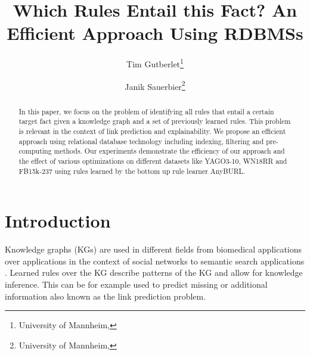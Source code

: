 \documentclass[english]{lni}
\begin{document}
\title[Which Rules Entail this Fact? An Efficient Approach Using RDBMSs]{Which Rules Entail this Fact? \newline An Efficient Approach Using RDBMSs}
\author[Tim Gutberlet \and Janik Sauerbier]
{Tim Gutberlet\footnote{University of Mannheim, } \and
Janik Sauerbier\footnote{University of Mannheim, }}
\maketitle

\begin{abstract}
 In this paper, we focus on the problem of identifying all rules that entail a certain target fact given a knowledge graph and a set of previously learned rules. This problem is relevant in the context of link prediction and explainability. We propose an efficient approach using relational database technology including indexing, filtering and pre-computing methods. Our experiments demonstrate the efficiency of our approach and the effect of various optimizations on different datasets like YAGO3-10, WN18RR and FB15k-237 using rules learned by the bottom up rule learner AnyBURL. 
 
\end{abstract}
\section{Introduction}
Knowledge graphs (KGs) are used in different fields from biomedical applications \cite{OpenBioLink} over applications in the context of social networks \cite{SocialNetworks} to semantic search applications \cite{SemanticSearch}. Learned rules over the KG describe patterns of the KG and allow for knowledge inference. This can be for example used to predict missing or additional information also known as the link prediction problem.
\end{document}
